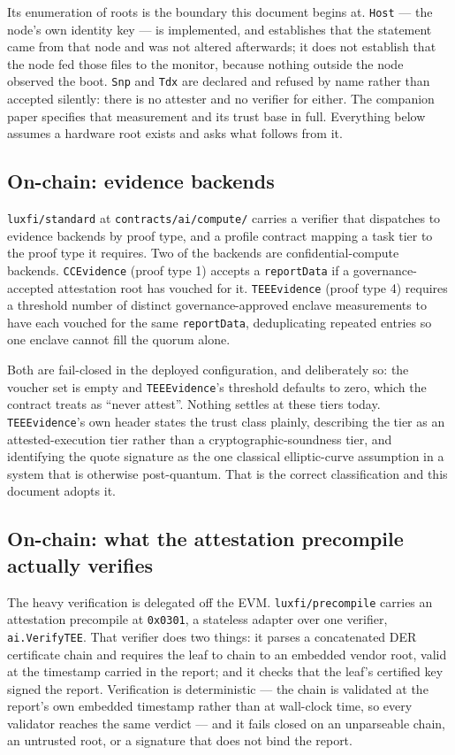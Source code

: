 \documentclass[11pt]{article}
\newcommand{\code}[1]{\texttt{#1}}
\begin{document}
Its enumeration of roots is the boundary this document begins at. \code{Host} --- the node's own
identity key --- is implemented, and establishes that the statement came from that node and was not
altered afterwards; it does not establish that the node fed those files to the monitor, because
nothing outside the node observed the boot. \code{Snp} and \code{Tdx} are declared and refused by
name rather than accepted silently: there is no attester and no verifier for either. The companion
paper \cite{hanzodattest} specifies that measurement and its trust base in full. Everything below
assumes a hardware root exists and asks what follows from it.

\subsection{On-chain: evidence backends}

\code{luxfi/standard} at \code{contracts/ai/compute/} carries a verifier that dispatches to evidence
backends by proof type, and a profile contract mapping a task tier to the proof type it requires.
Two of the backends are confidential-compute backends. \code{CCEvidence} (proof type 1) accepts a
\code{reportData} if a governance-accepted attestation root has vouched for it. \code{TEEEvidence}
(proof type 4) requires a threshold number of distinct governance-approved enclave measurements to have each vouched
for the same \code{reportData}, deduplicating repeated entries so one enclave cannot fill the quorum
alone.

Both are fail-closed in the deployed configuration, and deliberately so: the voucher set is empty
and \code{TEEEvidence}'s threshold defaults to zero, which the contract treats as ``never attest''.
Nothing settles at these tiers today. \code{TEEEvidence}'s own header states the trust class
plainly, describing the tier as an attested-execution tier rather than a cryptographic-soundness
tier, and identifying the quote signature as the one classical elliptic-curve assumption in a system
that is otherwise post-quantum. That is the correct classification and this document adopts it.

\subsection{On-chain: what the attestation precompile actually verifies}
\label{sec:precompile}

The heavy verification is delegated off the EVM. \code{luxfi/precompile} carries an attestation
precompile at \code{0x0301}, a stateless adapter over one verifier, \code{ai.VerifyTEE}. That
verifier does two things: it parses a concatenated DER certificate chain and requires the leaf to
chain to an embedded vendor root, valid at the timestamp carried in the report; and it checks that
the leaf's certified key signed the report. Verification is deterministic --- the chain is validated
at the report's own embedded timestamp rather than at wall-clock time, so every validator reaches
the same verdict --- and it fails closed on an unparseable chain, an untrusted root, or a signature
that does not bind the report.
\end{document}

